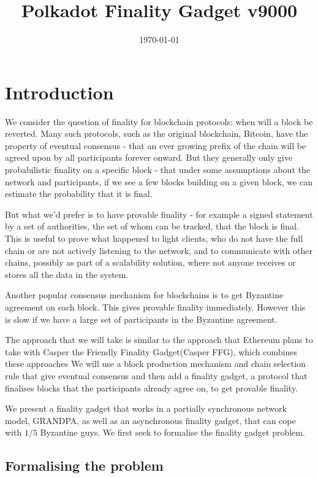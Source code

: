 \documentclass{article}
\begin{document}
\title{Polkadot Finality Gadget v9000}
\date{\today}
\maketitle

\section{Introduction}

We consider the question of finality for blockchain protocols: when will a block be reverted. Many such protocols, such as the original blockchain, Bitcoin, have the property of eventual consensus - that an ever growing prefix of the chain will be agreed upon by all participants forever onward.
But they generally only give probabilistic finality on a specific block - that under some assumptions about the network and participants, if we see a few blocks building on a given block, we can estimate the probability that it is final.

But what we'd prefer is to have provable finality - for example a signed statement by a set of authorities, the set of whom can be tracked, that the block is final.
This is useful to prove what happened to light clients, who do not have the full chain or are not actively listening to the network, and to communicate with other chains, possibly as part of a scalability solution, where not anyone receives or stores all the data in the system. 

Another popular consensus mechanism for blockchains is to get Byzantine agreement on each block.
This gives provable finality immediately. However this is slow if we have a large set of participants in the Byzantine agreement.

The approach that we will take is similar to the approach that Ethereum plans to take with Casper the Friendly Finality Gadget(Casper FFG)\cite{CasperFFG}, which combines these approaches
We will use a block production mechanism and chain selection rule that give eventual consensus and then add a finality gadget, a protocol that finalises blocks that the participants already agree on, to get provable finality.

We present a finality gadget that works in a partially synchronous network model, GRANDPA, as well as an asynchronous finality gadget, that can cope with $1/5$ Byzantine guys. We first seek to formalise the finality gadget problem.

\subsection{Formalising the problem}
\end{document}
